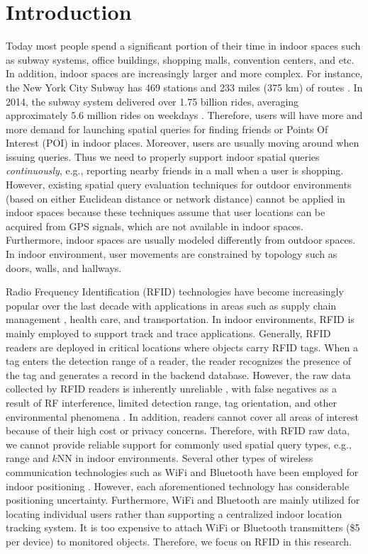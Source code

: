 \documentclass[12pt]{report}
\begin{document}
\part{Introduction}
\label{sec:introduction}
Today most people spend a significant portion of their time in
indoor spaces such as subway systems, office buildings, shopping
malls, convention centers, and etc.  In addition, indoor spaces are
increasingly larger and more complex.  For instance, the New York
City Subway has 469 stations and 233 miles (375 km) of routes
\cite{wikipedia2016-new}.  In 2014, the subway system delivered over
1.75 billion rides, averaging approximately 5.6 million rides on
weekdays \cite{authority2014-subway}.  Therefore, users will have more
and more demand for launching spatial queries for finding friends or
Points Of Interest (POI) in indoor places.  Moreover, users are
usually moving around when issuing queries.  Thus we need to
properly support indoor spatial queries \emph{continuously}, e.g.,
reporting nearby friends in a mall when a user is shopping.
However, existing spatial query evaluation techniques for outdoor
environments (based on either Euclidean distance or network
distance)
\cite{roussopoulos1995-nearest,hjaltason1999-distance,papadias2003-query,samet2008-scalable,lee2012-road}
cannot be applied in indoor spaces because these techniques assume
that user locations can be acquired from GPS signals, which are not
available in indoor spaces.  Furthermore, indoor spaces are usually
modeled differently from outdoor spaces.  In indoor environment,
user movements are constrained by topology such as doors, walls, and
hallways.

Radio Frequency Identification (RFID) technologies have become
increasingly popular over the last decade with applications in areas
such as supply chain management \cite{santos2008-rfid}, health care,
and transportation.  In indoor environments, RFID is mainly employed
to support track and trace applications.  Generally, RFID readers
are deployed in critical locations where objects carry RFID tags.
When a tag enters the detection range of a reader, the reader
recognizes the presence of the tag and generates a record in the
backend database.  However, the raw data collected by RFID readers
is inherently unreliable \cite{jeffery2006-adaptive}, with false
negatives as a result of RF interference, limited detection range,
tag orientation, and other environmental phenomena
\cite{welbourne2009-building}.  In addition, readers cannot cover all
areas of interest because of their high cost or privacy concerns.
Therefore, with RFID raw data, we cannot provide reliable support
for commonly used spatial query types, e.g., range and \(k\)NN in
indoor environments.  Several other types of wireless communication
technologies such as WiFi and Bluetooth have been employed for
indoor positioning \cite{anastasi2003-experimenting,bell2010-wifi}.
However, each aforementioned technology has considerable positioning
uncertainty.  Furthermore, WiFi and Bluetooth are mainly utilized
for locating individual users rather than supporting a centralized
indoor location tracking system.  It is too expensive to attach WiFi
or Bluetooth transmitters (\$5 per device) to monitored objects.
Therefore, we focus on RFID in this research.
\end{document}
